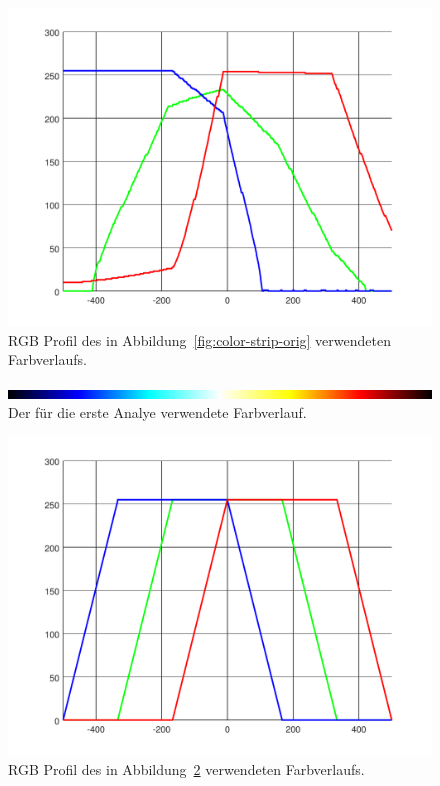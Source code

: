 \begin{figure}
	\centering
	\includegraphics[width=\linewidth]{cmb/converter/rgb-graph.pdf}
	\caption{RGB Profil des in Abbildung~\ref{fig:color-strip-orig} 
		verwendeten Farbverlaufs.}
	\label{fig:color-strip-orig-rgb}
\end{figure}

\begin{figure}
	\centering
	\includegraphics[width=\linewidth]{cmb/converter/converter-function-strip.png}
	\caption{Der für die erste Analye verwendete Farbverlauf.}
	\label{fig:color-strip}
\end{figure}

\begin{figure}
	\centering
	\includegraphics[width=\linewidth]{cmb/converter/converter-function.pdf}
	\caption{RGB Profil des in Abbildung~\ref{fig:color-strip} 
		verwendeten Farbverlaufs.}
	\label{fig:color-strip-rgb}
\end{figure}


